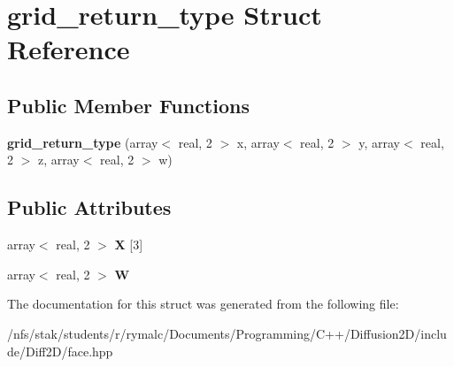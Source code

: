 \hypertarget{structgrid__return__type}{\section{grid\+\_\+return\+\_\+type Struct Reference}
\label{structgrid__return__type}
}
\subsection*{Public Member Functions}
\begin{DoxyCompactItemize}
\item 
\hypertarget{structgrid__return__type_a33e23ffd5df194fc15358a7ccd000c06}{{\bfseries grid\+\_\+return\+\_\+type} (array$<$ real, 2 $>$ x, array$<$ real, 2 $>$ y, array$<$ real, 2 $>$ z, array$<$ real, 2 $>$ w)}\label{structgrid__return__type_a33e23ffd5df194fc15358a7ccd000c06}

\end{DoxyCompactItemize}
\subsection*{Public Attributes}
\begin{DoxyCompactItemize}
\item 
\hypertarget{structgrid__return__type_adfba73ca3fa005cd92d149e4f5ee8eb9}{array$<$ real, 2 $>$ {\bfseries X} \mbox{[}3\mbox{]}}\label{structgrid__return__type_adfba73ca3fa005cd92d149e4f5ee8eb9}

\item 
\hypertarget{structgrid__return__type_ad54430af032753fc820e25c15ec35ad2}{array$<$ real, 2 $>$ {\bfseries W}}\label{structgrid__return__type_ad54430af032753fc820e25c15ec35ad2}

\end{DoxyCompactItemize}


The documentation for this struct was generated from the following file\+:\begin{DoxyCompactItemize}
\item 
/nfs/stak/students/r/rymalc/\+Documents/\+Programming/\+C++/\+Diffusion2\+D/include/\+Diff2\+D/face.\+hpp\end{DoxyCompactItemize}
